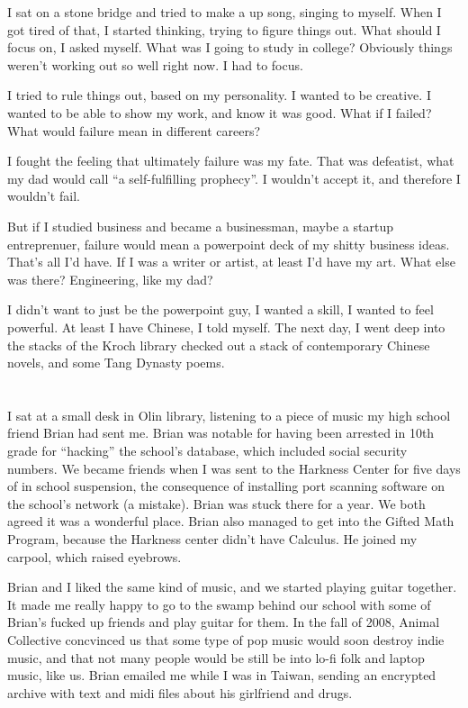 I sat on a stone bridge and tried to make a up song, singing to myself.  When I
got tired of that, I started thinking, trying to figure things out.  What should
I focus on, I asked myself.  What was I going to study in college?  Obviously
things weren't working out so well right now.  I had to focus.

I tried to rule things out, based on my personality.  I wanted to be creative.
I wanted to be able to show my work, and know it was good.  What if I failed?
What would failure mean in different careers? 

I fought the feeling that ultimately failure was my fate.  That was defeatist,
what my dad would call ``a self-fulfilling prophecy''.  I wouldn't accept it,
and therefore I wouldn't fail.  

But if I studied business and became a businessman, maybe a startup
entreprenuer, failure would mean a powerpoint deck of my shitty business ideas.
That's all I'd have.  If I was a writer or artist, at least I'd have my art.
What else was there?  Engineering, like my dad? 

I didn't want to just be the powerpoint guy, I wanted a skill, I wanted to feel
powerful.  At least I have Chinese, I told myself.  The next day, I went deep
into the stacks of the Kroch library checked out a stack of contemporary Chinese
novels, and some Tang Dynasty poems.

\section{}

I sat at a small desk in Olin library, listening to a piece of music my high
school friend Brian had sent me.  Brian was notable for having been arrested in
10th grade for ``hacking'' the school's database, which included social security
numbers.  We became friends when I was sent to the Harkness Center for five days
of in school suspension, the consequence of installing port scanning software on
the school's network (a mistake).  Brian was stuck there for a year.  We both
agreed it was a wonderful place.  Brian also managed to get into the Gifted Math
Program, because the Harkness center didn't have Calculus.  He joined my carpool,
which raised eyebrows.

Brian and I liked the same kind of music, and we started playing guitar
together.  It made me really happy to go to the swamp behind our school with
some of Brian's fucked up friends and play guitar for them.  In the fall of
2008, Animal Collective concvinced us that some type of pop music would soon
destroy indie music,  and that not many people would be still be into lo-fi folk
and laptop music, like us.  Brian emailed me while I was in Taiwan, sending an
encrypted archive with text and midi files about his girlfriend and drugs.

